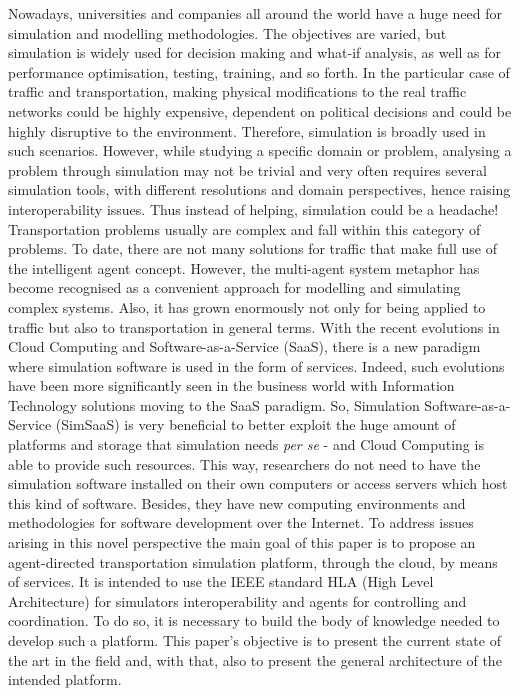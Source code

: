 \documentclass[a0paper,fontscale=0.4125,landscape]{baposter} %
\begin{document}
\begin{poster}
 {Nowadays, universities and companies all around the world have a huge need for simulation and modelling methodologies. The objectives are varied, but simulation is widely used for decision making and what-if analysis, as well as for performance optimisation, testing, training, and so forth. In the particular case of traffic and transportation, making physical modifications to the real traffic networks could be highly expensive, dependent on political decisions and could be highly disruptive to the environment. Therefore, simulation is broadly used in such scenarios.
However, while studying a specific domain or problem, analysing a problem through simulation may not be trivial and very often requires several simulation tools, with different resolutions and domain perspectives, hence raising interoperability issues. Thus instead of helping, simulation could be a headache! Transportation problems usually are complex and fall within this category of problems.
To date, there are not many solutions for traffic that make full use of the intelligent agent concept. However, the multi-agent system metaphor has become recognised as a convenient approach for modelling and simulating complex systems. Also, it has grown enormously not only for being applied to traffic but also to transportation in general terms.
With the recent evolutions in Cloud Computing and Software-as-a-Service (SaaS), there is a new paradigm where simulation software is used in the form of services. Indeed, such evolutions have been more significantly seen in the business world with Information Technology solutions moving to the SaaS paradigm. So, Simulation Software-as-a-Service (SimSaaS) is very beneficial to better exploit the huge amount of platforms and storage that simulation needs \textit{per se} - and Cloud Computing is able to provide such resources. This way, researchers do not need to have the simulation software installed on their own computers or access servers which host this kind of software. Besides, they have new computing environments and methodologies for software development over the Internet.
To address issues arising in this novel perspective the main goal of this paper is to propose an agent-directed transportation simulation platform, through the cloud, by means of services. It is intended to use the IEEE standard HLA (High Level Architecture) for simulators interoperability and agents for controlling and coordination. To do so, it is necessary to build the body of knowledge needed to develop such a platform. This paper's objective is to present the current state of the art in the field and, with that, also to present the general architecture of the intended platform.
}
\end{poster}
\end{document}
